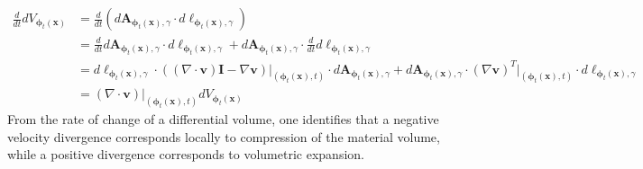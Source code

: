 \begin{align}\label{eq:dV_dt}
    \frac{d}{dt}dV_{\bm{\phi}_t(\bm{x})}&=\frac{d}{dt}\left(d\bm{A}_{\bm{\phi}_t(\bm{x}),\gamma}\cdot d\bm{\ell}_{\bm{\phi}_t(\bm{x}),\gamma}\right)\nonumber\\
    &=\frac{d}{dt}d\bm{A}_{\bm{\phi}_t(\bm{x}),\gamma}\cdot d\bm{\ell}_{\bm{\phi}_t(\bm{x}),\gamma}+d\bm{A}_{\bm{\phi}_t(\bm{x}),\gamma}\cdot\frac{d}{dt}d\bm{\ell}_{\bm{\phi}_t(\bm{x}),\gamma}\nonumber\\
    &=d\bm{\ell}_{\bm{\phi}_t(\bm{x}),\gamma}\cdot \left((\nabla\cdot\bm{v})\bm{I}-\nabla\bm{v}\right)\Big|_{(\bm{\phi}_t(\bm{x}),t)}\cdot d\bm{A}_{\bm{\phi}_t(\bm{x}),\gamma}+d\bm{A}_{\bm{\phi}_t(\bm{x}),\gamma}\cdot(\nabla\bm{v})^T\Big|_{(\bm{\phi}_t(\bm{x}),t)}\cdot d\bm{\ell}_{\bm{\phi}_t(\bm{x}),\gamma}\nonumber\\
    &=(\nabla\cdot\bm{v})\Big|_{(\bm{\phi}_t(\bm{x}),t)}dV_{\bm{\phi}_t(\bm{x})}
\end{align}
From the rate of change of a differential volume, one identifies that a negative velocity divergence corresponds locally to compression of the material volume, while a positive divergence corresponds to volumetric expansion.

